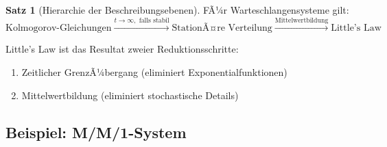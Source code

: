 ﻿\documentclass[a4paper,12pt]{report}
\theoremstyle{definition}
\newtheorem{satz}{Satz}[section]
\begin{document}
\begin{satz}[Hierarchie der Beschreibungsebenen]
	FÃ¼r Warteschlangensysteme gilt:
	\begin{equation}
		\text{Kolmogorov-Gleichungen} \xrightarrow{t \to \infty, \text{ falls stabil}} \text{StationÃ¤re Verteilung} \xrightarrow{\text{Mittelwertbildung}} \text{Little's Law}
	\end{equation}
	
	Little's Law ist das Resultat zweier Reduktionsschritte:
	\begin{enumerate}
		\item[-] Zeitlicher GrenzÃ¼bergang (eliminiert Exponentialfunktionen)
		\item[-] Mittelwertbildung (eliminiert stochastische Details)
	\end{enumerate}
\end{satz}

\subsection{Beispiel: M/M/1-System}
\end{document}
